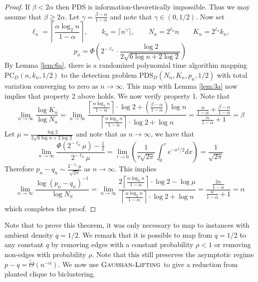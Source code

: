 \begin{proof}
If $\beta < 2\alpha$ then PDS is information-theoretically impossible. Thus we may assume that $\beta \ge 2\alpha$. Let $\gamma = \frac{\beta - \alpha}{1 - \alpha}$ and note that $\gamma \in (0, 1/2)$. Now set
$$\ell_n = \left\lceil \frac{\alpha \log_2 n}{1 - \alpha} \right\rceil, \quad \quad k_n = \lceil n^{\gamma} \rceil, \quad \quad N_n = 2^{\ell_n} n \quad \quad K_n = 2^{\ell_n} k_n,$$
$$p_n = \Phi\left( 2^{-\ell_n} \cdot \frac{\log 2}{2 \sqrt{6 \log n + 2\log 2}} \right)$$
By Lemma \ref{lem:6a}, there is a randomized polynomial time algorithm mapping $\text{PC}_D(n, k_n, 1/2)$ to the detection problem $\text{PDS}_D(N_n, K_n, p_n, 1/2)$ with total variation converging to zero as $n \to \infty$. This map with Lemma \ref{lem:3a} now implies that property 2 above holds. We now verify property 1. Note that
$$\lim_{n \to \infty} \frac{\log K_n}{\log N_n} = \lim_{n \to \infty} \frac{\left\lceil \frac{\alpha \log_2 n}{1 - \alpha} \right\rceil \cdot \log 2 + \left( \frac{\beta - \alpha}{1 - \alpha} \right) \log n}{\left\lceil \frac{\alpha \log_2 n}{1 - \alpha} \right\rceil\cdot \log 2 + \log n} = \frac{\frac{\alpha}{1 - \alpha} + \frac{\beta - \alpha}{1 - \alpha}}{\frac{\alpha}{1 - \alpha} + 1} = \beta$$
Let $\mu = \frac{\log 2}{2 \sqrt{6 \log n + 2\log 2}}$ and note that as $n \to \infty$, we have that
$$\lim_{n \to \infty} \frac{\Phi\left( 2^{-\ell_n} \mu \right) - \frac{1}{2}}{2^{-\ell_n} \mu} = \lim_{\tau \to 0} \left( \frac{1}{\tau \sqrt{2\pi}} \int_0^\tau e^{-x^2/2} dx \right) = \frac{1}{\sqrt{2\pi}}$$
Therefore $p_n - q_n \sim \frac{2^{-\ell_n} \mu}{\sqrt{2\pi}}$ as $n \to \infty$. This implies
$$\lim_{n \to \infty} \frac{\log (p_n - q_n)^{-1}}{\log N_n} = \lim_{n \to \infty} \frac{2\left\lceil \frac{\alpha \log_2 n}{1 - \alpha} \right\rceil \cdot \log 2 - \log \mu}{\left\lceil \frac{\alpha \log_2 n}{1 - \alpha} \right\rceil\cdot \log 2 + \log n} = \frac{\frac{2\alpha}{1 - \alpha}}{\frac{\alpha}{1 - \alpha} + 1} = \alpha$$
which completes the proof.
\end{proof}

Note that to prove this theorem, it was only necessary to map to instances with ambient density $q = 1/2$. We remark that it is possible to map from $q = 1/2$ to any constant $q$ by removing edges with a constant probability $\rho < 1$ or removing non-edges with probability $\rho$. Note that this still preserves the asymptotic regime $p - q = \tilde{\Theta}(n^{-\alpha})$. We now use $\textsc{Gaussian-Lifting}$ to give a reduction from planted clique to biclustering.

